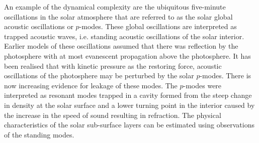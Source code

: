 \documentclass[linenumbers]{aastex63}
\begin{document}

 





An example of the dynamical complexity are the ubiquitous five-minute oscillations in the solar atmosphere that are referred to as the solar global acoustic oscillations or $p$-modes. These global oscillations are interpreted as trapped acoustic waves, i.e. standing acoustic oscillations of the solar interior. Earlier models of these oscillations assumed that there was reflection by the photosphere with at most evanescent propagation above the photosphere. It has been realised that with kinetic pressure as the restoring force, acoustic oscillations of the photosphere may be perturbed by the solar $p$-modes. There is now increasing evidence for leakage of these modes. The $p$-modes were interpreted as resonant modes trapped in a cavity formed from the steep change in density at the solar surface and a lower turning point in the interior caused by the increase in the speed of sound resulting in refraction. The physical characteristics of the solar sub-surface layers can be estimated using observations of the standing modes.




\end{document}
